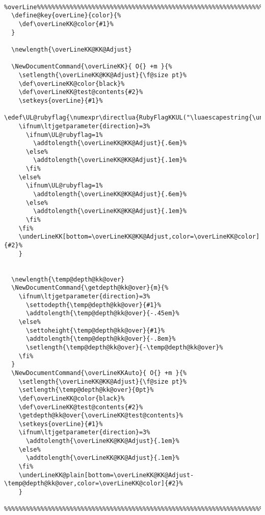 \documentclass[luatex,fontsize=8pt,paper=b5,twoside]{jlreq}%
\begin{document}
\begin{lstlisting}
  %overLine%%%%%%%%%%%%%%%%%%%%%%%%%%%%%%%%%%%%%%%%%%%%%%%%%%%%%%%%%%%%%%%%%%%%%%%%%%%%%%%%
  \define@key{overLine}{color}{%
    \def\overLineKK@color{#1}%
  }

  \newlength{\overLineKK@KK@Adjust}

  \NewDocumentCommand{\overLineKK}{ O{} +m }{%
    \setlength{\overLineKK@KK@Adjust}{\f@size pt}%
    \def\overLineKK@color{black}%
    \def\overLineKK@test@contents{#2}%
    \setkeys{overLine}{#1}%
    \edef\UL@rubyflag{\numexpr\directlua{RubyFlagKKUL("\luaescapestring{\unexpanded\expandafter{\overLineKK@test@contents}}")}\relax}%
    \ifnum\ltjgetparameter{direction}=3%
      \ifnum\UL@rubyflag=1%
        \addtolength{\overLineKK@KK@Adjust}{.6em}%
      \else%
        \addtolength{\overLineKK@KK@Adjust}{.1em}%
      \fi%
    \else%
      \ifnum\UL@rubyflag=1%
        \addtolength{\overLineKK@KK@Adjust}{.6em}%
      \else%
        \addtolength{\overLineKK@KK@Adjust}{.1em}%
      \fi%
    \fi%
    \underLineKK[bottom=\overLineKK@KK@Adjust,color=\overLineKK@color]{#2}%
    }


  \newlength{\temp@depth@kk@over}
  \NewDocumentCommand{\getdepth@kk@over}{m}{%
    \ifnum\ltjgetparameter{direction}=3%
      \settodepth{\temp@depth@kk@over}{#1}%
      \addtolength{\temp@depth@kk@over}{-.45em}%
    \else%
      \settoheight{\temp@depth@kk@over}{#1}%
      \addtolength{\temp@depth@kk@over}{-.8em}%
      \setlength{\temp@depth@kk@over}{-\temp@depth@kk@over}%
    \fi%
  }
  \NewDocumentCommand{\overLineKKAuto}{ O{} +m }{%
    \setlength{\overLineKK@KK@Adjust}{\f@size pt}%
    \setlength{\temp@depth@kk@over}{0pt}%
    \def\overLineKK@color{black}%
    \def\overLineKK@test@contents{#2}%
    \getdepth@kk@over{\overLineKK@test@contents}%
    \setkeys{overLine}{#1}%
    \ifnum\ltjgetparameter{direction}=3%
      \addtolength{\overLineKK@KK@Adjust}{.1em}%
    \else%
      \addtolength{\overLineKK@KK@Adjust}{.1em}%
    \fi%
    \underLineKK@plain[bottom=\overLineKK@KK@Adjust-\temp@depth@kk@over,color=\overLineKK@color]{#2}%
    }
  %%%%%%%%%%%%%%%%%%%%%%%%%%%%%%%%%%%%%%%%%%%%%%%%%%%%%%%%%%%%%%%%%%%%%%%%%%%%%%%%%%%%%%%%%



\end{lstlisting}
\end{document}
